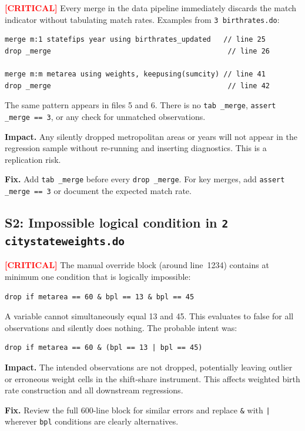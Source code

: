 \documentclass[11pt]{article}
\newcommand{\critical}{\textcolor{red}{\textbf{[CRITICAL]}}}
\begin{document}
\critical{} Every merge in the data pipeline immediately discards the match
indicator without tabulating match rates. Examples from \texttt{3 birthrates.do}:
\begin{verbatim}
merge m:1 statefips year using birthrates_updated   // line 25
drop _merge                                          // line 26

merge m:m metarea using weights, keepusing(sumcity) // line 41
drop _merge                                          // line 42
\end{verbatim}
The same pattern appears in files 5 and 6. There is no \texttt{tab \_merge},
\texttt{assert \_merge == 3}, or any check for unmatched observations.

\noindent\textbf{Impact.} Any silently dropped metropolitan areas or years will not
appear in the regression sample without re-running and inserting diagnostics.
This is a replication risk.

\noindent\textbf{Fix.} Add \texttt{tab \_merge} before every \texttt{drop \_merge}.
For key merges, add \texttt{assert \_merge == 3} or document the expected match rate.

\subsection*{S2: Impossible logical condition in \texttt{2 citystateweights.do}}

\critical{} The manual override block (around line~1234) contains at minimum one
condition that is logically impossible:
\begin{verbatim}
drop if metarea == 60 & bpl == 13 & bpl == 45
\end{verbatim}
A variable cannot simultaneously equal 13 and 45. This evaluates to false for all
observations and silently does nothing. The probable intent was:
\begin{verbatim}
drop if metarea == 60 & (bpl == 13 | bpl == 45)
\end{verbatim}

\noindent\textbf{Impact.} The intended observations are not dropped, potentially leaving
outlier or erroneous weight cells in the shift-share instrument. This affects weighted
birth rate construction and all downstream regressions.

\noindent\textbf{Fix.} Review the full 600-line block for similar errors and replace
\texttt{\&} with \texttt{|} wherever \texttt{bpl} conditions are clearly alternatives.

\end{document}
